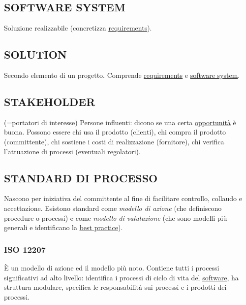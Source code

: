		\subsection{SOFTWARE SYSTEM}  \label{sistemasoftware} 
		Soluzione realizzabile (concretizza \underline{\hyperref[requirements]{requirements}}).
		
		\subsection{SOLUTION}  \label{solution}
		Secondo elemento di un progetto. Comprende \underline{\hyperref[requirements]{requirements}} e \underline{\hyperref[sistemasoftware]{software system}}.
		
		\subsection{STAKEHOLDER}  \label{stakeholder} 
		(=portatori di interesse) Persone influenti: dicono se una certa \underline{\hyperref[opportunity]{opportunità}} è buona. Possono essere chi usa il prodotto (clienti), chi compra il prodotto (committente), chi sostiene i costi di realizzazione (fornitore), chi verifica l'attuazione di processi (eventuali regolatori).
		
		\subsection{STANDARD DI PROCESSO}  \label{standard} 
		Nascono per iniziativa del committente al fine di facilitare controllo, collaudo e accettazione. Esistono standard come \textit{modello di azione} (che definiscono procedure o processi) e come \textit{modello di valutazione} (che sono modelli più generali e identificano la \underline{\hyperref[bes]{best practice}}).
		
			\subsubsection{ISO 12207}	\label{12207}
			È un modello di azione ed il modello più noto. Contiene tutti i processi significativi ad alto livello: identifica i processi di ciclo di vita del \underline{\hyperref[prodotto]{software}}, ha struttura modulare, specifica le responsabilità sui processi e i prodotti dei processi.
			
